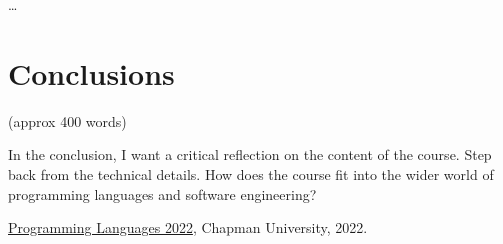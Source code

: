 \documentclass{article}
\theoremstyle{theorem}
\theoremstyle{definition}
\theoremstyle{remark}
\begin{document}
\ldots

\section{Conclusions}\label{conclusions}

(approx 400 words)

In the conclusion, I want a critical reflection on the content of the course. Step back from the technical details. How does the course fit into the wider world of programming languages and software engineering?

\begin{thebibliography}{99}
 \href{https://github.com/alexhkurz/programming-languages-2022/blob/main/README.md}{Programming Languages 2022}, Chapman University, 2022.
\end{thebibliography}
\end{document}
